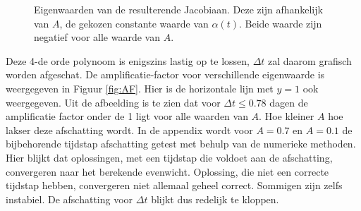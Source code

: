 \begin{figure}[H]
  \centering
  \hfill
  \caption{Eigenwaarden van de resulterende Jacobiaan. Deze zijn afhankelijk van $A$, de gekozen constante waarde van $\alpha(t)$. Beide waarde zijn negatief voor alle waarde van $A$.}
  \label{fig:eigen}
\end{figure}
Deze 4-de orde polynoom is enigszins lastig op te lossen, $\Delta t$ zal daarom grafisch worden afgeschat. De amplificatie-factor voor verschillende eigenwaarde is weergegeven in Figuur \ref{fig:AF}. Hier is de horizontale lijn met $y=1$ ook weergegeven. Uit de afbeelding is te zien dat voor $\Delta t \leq 0.78$ dagen de amplificatie factor onder de 1 ligt voor alle waarden van $A$. Hoe kleiner $A$ hoe lakser deze afschatting wordt. In de appendix wordt voor $A=0.7$ en $A=0.1$ de bijbehorende tijdstap afschatting getest met behulp van de numerieke methoden. Hier blijkt dat oplossingen, met een tijdstap die voldoet aan de afschatting, convergeren naar het berekende evenwicht. Oplossing, die niet een correcte tijdstap hebben, convergeren niet allemaal geheel correct. Sommigen zijn zelfs instabiel. De afschatting voor $\Delta t$ blijkt dus redelijk te kloppen.


